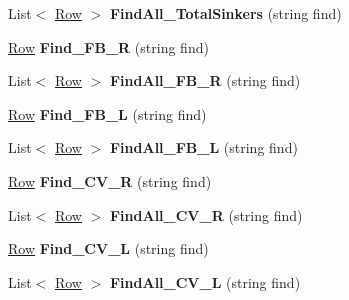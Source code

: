 \begin{DoxyCompactItemize}
\item 
List$<$ \hyperlink{class_stats_script_1_1_row}{Row} $>$ {\bfseries Find\+All\+\_\+\+Total\+Sinkers} (string find)\hypertarget{class_stats_script_a8370afde589ac6207216689cab83c1db}{}\label{class_stats_script_a8370afde589ac6207216689cab83c1db}

\item 
\hyperlink{class_stats_script_1_1_row}{Row} {\bfseries Find\+\_\+\+F\+B\+\_\+R} (string find)\hypertarget{class_stats_script_a76486406bc087aff1ea8735146504d0d}{}\label{class_stats_script_a76486406bc087aff1ea8735146504d0d}

\item 
List$<$ \hyperlink{class_stats_script_1_1_row}{Row} $>$ {\bfseries Find\+All\+\_\+\+F\+B\+\_\+R} (string find)\hypertarget{class_stats_script_a20c3366fd73055ffaa988be2b64e50cf}{}\label{class_stats_script_a20c3366fd73055ffaa988be2b64e50cf}

\item 
\hyperlink{class_stats_script_1_1_row}{Row} {\bfseries Find\+\_\+\+F\+B\+\_\+L} (string find)\hypertarget{class_stats_script_a6d09e31d991daf56b8345490130915b8}{}\label{class_stats_script_a6d09e31d991daf56b8345490130915b8}

\item 
List$<$ \hyperlink{class_stats_script_1_1_row}{Row} $>$ {\bfseries Find\+All\+\_\+\+F\+B\+\_\+L} (string find)\hypertarget{class_stats_script_a0d5e639a0e1fd911bae9eaa07ab64b9a}{}\label{class_stats_script_a0d5e639a0e1fd911bae9eaa07ab64b9a}

\item 
\hyperlink{class_stats_script_1_1_row}{Row} {\bfseries Find\+\_\+\+C\+V\+\_\+R} (string find)\hypertarget{class_stats_script_a5199e8c2ed5a2a45769b28190dd3394e}{}\label{class_stats_script_a5199e8c2ed5a2a45769b28190dd3394e}

\item 
List$<$ \hyperlink{class_stats_script_1_1_row}{Row} $>$ {\bfseries Find\+All\+\_\+\+C\+V\+\_\+R} (string find)\hypertarget{class_stats_script_afcaaf0943208b3bf8c75c28956f6d73c}{}\label{class_stats_script_afcaaf0943208b3bf8c75c28956f6d73c}

\item 
\hyperlink{class_stats_script_1_1_row}{Row} {\bfseries Find\+\_\+\+C\+V\+\_\+L} (string find)\hypertarget{class_stats_script_a712ccd0e03a6071271086a3182677b67}{}\label{class_stats_script_a712ccd0e03a6071271086a3182677b67}

\item 
List$<$ \hyperlink{class_stats_script_1_1_row}{Row} $>$ {\bfseries Find\+All\+\_\+\+C\+V\+\_\+L} (string find)\hypertarget{class_stats_script_a48569a8c50159299274840b241b16349}{}\label{class_stats_script_a48569a8c50159299274840b241b16349}


\end{DoxyCompactItemize}

